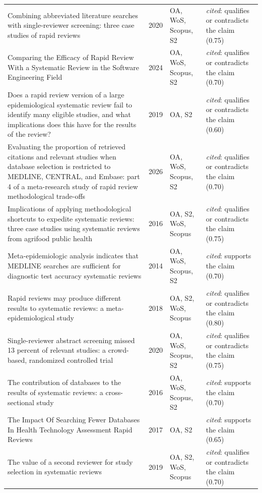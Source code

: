 \begin{longtable}{@{}%
  >{\raggedright\arraybackslash}p{}c%
  >{\raggedright\arraybackslash}p{}%
  >{\raggedright\arraybackslash}p{}@{}}
Combining abbreviated literature searches with single-reviewer screening: three case studies of rapid reviews & 2020 & OA, WoS, Scopus, S2 & \emph{cited}: qualifies or contradicts the claim (0.75) \\
Comparing the Efficacy of Rapid Review With a Systematic Review in the Software Engineering Field & 2024 & OA, WoS, Scopus, S2 & \emph{cited}: qualifies or contradicts the claim (0.70) \\
Does a rapid review version of a large epidemiological systematic review fail to identify many eligible studies, and what implications does this have for the results of the review? & 2019 & OA, S2 & \emph{cited}: qualifies or contradicts the claim (0.60) \\
Evaluating the proportion of retrieved citations and relevant studies when database selection is restricted to MEDLINE, CENTRAL, and Embase: part 4 of a meta-research study of rapid review methodological trade-offs & 2026 & OA, WoS, Scopus, S2 & \emph{cited}: qualifies or contradicts the claim (0.70) \\
Implications of applying methodological shortcuts to expedite systematic reviews: three case studies using systematic reviews from agrifood public health & 2016 & OA, S2, WoS, Scopus & \emph{cited}: qualifies or contradicts the claim (0.75) \\
Meta-epidemiologic analysis indicates that MEDLINE searches are sufficient for diagnostic test accuracy systematic reviews & 2014 & OA, WoS, Scopus, S2 & \emph{cited}: supports the claim (0.70) \\
Rapid reviews may produce different results to systematic reviews: a meta-epidemiological study & 2018 & OA, S2, WoS, Scopus & \emph{cited}: qualifies or contradicts the claim (0.80) \\
Single-reviewer abstract screening missed 13 percent of relevant studies: a crowd-based, randomized controlled trial & 2020 & OA, WoS, Scopus, S2 & \emph{cited}: qualifies or contradicts the claim (0.75) \\
The contribution of databases to the results of systematic reviews: a cross-sectional study & 2016 & OA, WoS, Scopus, S2 & \emph{cited}: supports the claim (0.70) \\
The Impact Of Searching Fewer Databases In Health Technology Assessment Rapid Reviews & 2017 & OA, S2 & \emph{cited}: supports the claim (0.65) \\
The value of a second reviewer for study selection in systematic reviews & 2019 & OA, S2, WoS, Scopus & \emph{cited}: qualifies or contradicts the claim (0.70) \\

\end{longtable}
